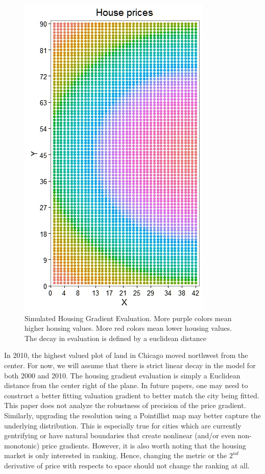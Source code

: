 \documentclass[11pt]{asaproc}
\newcommand{\1}{\mathbb{1}}
\begin{document}
\begin{figure}[h!]
\centering
    \includegraphics[scale=0.6]{figures/House_Price.jpeg}
    \caption[Simulated Housing Gradient Evaluation]{Simulated Housing Gradient Evaluation. More purple colors mean higher housing values. More red colors mean lower housing values. The decay in evaluation is defined by a euclidean distance}
\end{figure}


In 2010, the highest valued plot of land in Chicago moved northwest from the center. For now, we will assume that there is strict linear decay in the model for both 2000 and 2010. The housing gradient evaluation is simply a Euclidean distance from the center right of the plane. In future papers, one may need to construct a better fitting valuation gradient to better match the city being fitted. This paper does not analyze the robustness of precision of the price gradient. Similarly, upgrading the resolution using a Pointillist map may better capture the underlying distribution. This is especially true for cities which are currently gentrifying or have natural boundaries that create nonlinear (and/or even non-monotonic) price gradients. However, it is also worth noting that the housing market is only interested in ranking. Hence, changing the metric or the $2^{nd}$ derivative of price with respects to space should not change the ranking at all.
\end{document}
